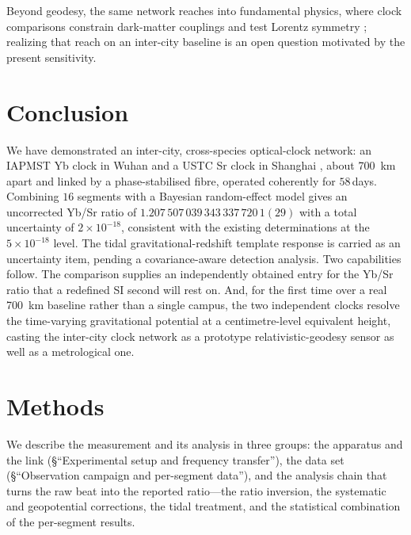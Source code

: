 \documentclass[11pt,a4paper]{article}
\newcommand{\e}[1]{\times 10^{#1}}
\begin{document}
Beyond geodesy, the same network reaches into fundamental physics, where
clock comparisons constrain dark-matter couplings \citep{wcislo2018global,
roberts2017domain} and test Lorentz symmetry \citep{sanner2019lorentz};
realizing that reach on an inter-city baseline is an open question
motivated by the present sensitivity.

\section{Conclusion}
\label{sec:conclusion}

We have demonstrated an inter-city, cross-species optical-clock network:
an IAPMST Yb clock in Wuhan \citep{zhu2026yb} and a USTC Sr clock in
Shanghai \citep{jia2026sr}, about \qty{700}{km} apart and linked by a
phase-stabilised fibre, operated coherently for $58$\,days. Combining
$16$ segments with a Bayesian random-effect model gives an uncorrected
Yb/Sr ratio of $1.207\,507\,039\,343\,337\,720\,1(29)$ with a total
uncertainty of $2\e{-18}$, consistent with the existing determinations at
the $5\e{-18}$ level. The tidal gravitational-redshift template response is
carried as an uncertainty item, pending a covariance-aware detection analysis.
Two capabilities follow. The comparison supplies an independently
obtained entry for the Yb/Sr ratio that a redefined SI second will rest
on. And, for the first time over a real \qty{700}{km} baseline rather than a
single campus, the two independent clocks resolve the time-varying
gravitational potential at a centimetre-level equivalent height, casting
the inter-city clock network as a prototype relativistic-geodesy sensor
as well as a metrological one.

\section{Methods}

We describe the measurement and its analysis in three groups: the
apparatus and the link (§``Experimental setup and frequency transfer''),
the data set (§``Observation campaign and per-segment data''), and the
analysis chain that turns the raw beat into the reported ratio---the
ratio inversion, the systematic and geopotential corrections, the tidal
treatment, and the statistical combination of the per-segment results.
\end{document}
